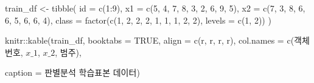 \documentclass[
]{book}
\newenvironment{Shaded}{\begin{snugshade}}{\end{snugshade}}
\newcommand{\AttributeTok}[1]{\textcolor[rgb]{0.77,0.63,0.00}{#1}}
\newcommand{\ConstantTok}[1]{\textcolor[rgb]{0.00,0.00,0.00}{#1}}
\newcommand{\DecValTok}[1]{\textcolor[rgb]{0.00,0.00,0.81}{#1}}
\newcommand{\FunctionTok}[1]{\textcolor[rgb]{0.00,0.00,0.00}{#1}}
\newcommand{\NormalTok}[1]{#1}
\newcommand{\OtherTok}[1]{\textcolor[rgb]{0.56,0.35,0.01}{#1}}
\newcommand{\SpecialCharTok}[1]{\textcolor[rgb]{0.00,0.00,0.00}{#1}}
\newcommand{\StringTok}[1]{\textcolor[rgb]{0.31,0.60,0.02}{#1}}
\begin{document}
\begin{Shaded}
\begin{Highlighting}[]
\NormalTok{train\_df }\OtherTok{\textless{}{-}} \FunctionTok{tibble}\NormalTok{(}
  \AttributeTok{id =} \FunctionTok{c}\NormalTok{(}\DecValTok{1}\SpecialCharTok{:}\DecValTok{9}\NormalTok{),}
  \AttributeTok{x1 =} \FunctionTok{c}\NormalTok{(}\DecValTok{5}\NormalTok{, }\DecValTok{4}\NormalTok{, }\DecValTok{7}\NormalTok{, }\DecValTok{8}\NormalTok{, }\DecValTok{3}\NormalTok{, }\DecValTok{2}\NormalTok{, }\DecValTok{6}\NormalTok{, }\DecValTok{9}\NormalTok{, }\DecValTok{5}\NormalTok{),}
  \AttributeTok{x2 =} \FunctionTok{c}\NormalTok{(}\DecValTok{7}\NormalTok{, }\DecValTok{3}\NormalTok{, }\DecValTok{8}\NormalTok{, }\DecValTok{6}\NormalTok{, }\DecValTok{6}\NormalTok{, }\DecValTok{5}\NormalTok{, }\DecValTok{6}\NormalTok{, }\DecValTok{6}\NormalTok{, }\DecValTok{4}\NormalTok{),}
  \AttributeTok{class =} \FunctionTok{factor}\NormalTok{(}\FunctionTok{c}\NormalTok{(}\DecValTok{1}\NormalTok{, }\DecValTok{2}\NormalTok{, }\DecValTok{2}\NormalTok{, }\DecValTok{2}\NormalTok{, }\DecValTok{1}\NormalTok{, }\DecValTok{1}\NormalTok{, }\DecValTok{1}\NormalTok{, }\DecValTok{2}\NormalTok{, }\DecValTok{2}\NormalTok{), }\AttributeTok{levels =} \FunctionTok{c}\NormalTok{(}\DecValTok{1}\NormalTok{, }\DecValTok{2}\NormalTok{))}
\NormalTok{)}

\NormalTok{knitr}\SpecialCharTok{::}\FunctionTok{kable}\NormalTok{(train\_df, }\AttributeTok{booktabs =} \ConstantTok{TRUE}\NormalTok{,}
             \AttributeTok{align =} \FunctionTok{c}\NormalTok{(}\StringTok{\textquotesingle{}r\textquotesingle{}}\NormalTok{, }\StringTok{\textquotesingle{}r\textquotesingle{}}\NormalTok{, }\StringTok{\textquotesingle{}r\textquotesingle{}}\NormalTok{, }\StringTok{\textquotesingle{}r\textquotesingle{}}\NormalTok{),}
             \AttributeTok{col.names =} \FunctionTok{c}\NormalTok{(}\StringTok{\textquotesingle{}객체번호\textquotesingle{}}\NormalTok{, }\StringTok{\textquotesingle{}$x\_1$\textquotesingle{}}\NormalTok{, }\StringTok{\textquotesingle{}$x\_2$\textquotesingle{}}\NormalTok{, }\StringTok{\textquotesingle{}범주\textquotesingle{}}\NormalTok{),}
             
             \AttributeTok{caption =} \StringTok{\textquotesingle{}판별분석 학습표본 데이터\textquotesingle{}}\NormalTok{)}
\end{Highlighting}
\end{Shaded}
\end{document}
